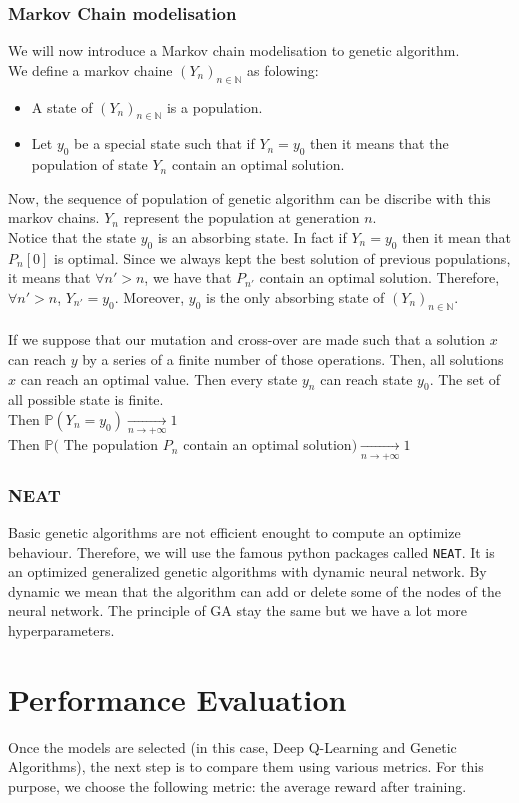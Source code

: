 \documentclass[11pt,a4paper]{article}
\newcommand{\mlist}[1]{\begin{itemize}[noitemsep,topsep=0pt]#1\end{itemize}}
\begin{document}
		\section{Markov Chain modelisation}
We will now introduce a Markov chain modelisation to genetic algorithm.\\
We define a markov chaine $(Y_n)_{n\in\mathbb{N}}$ as folowing:
\mlist{
\item A state of $(Y_n)_{n\in\mathbb{N}}$ is a population.
\item Let $y_0$ be a special state such that if $Y_n = y_0$ then it means that the population of state $Y_n$ contain an optimal solution.
}
Now, the sequence of population of genetic algorithm can be discribe with this markov chains. $Y_n$ represent the population at generation $n$.\\
Notice that the state $y_0$ is an absorbing state. In fact if $Y_n = y_0$ then it mean that $P_n[0]$ is optimal. Since we always kept the best solution of previous populations, it means that $\forall n'>n$, we have that $P_{n'}$ contain an optimal solution. Therefore, $\forall n'>n$, $Y_{n'} = y_0$. Moreover, $y_0$ is the only absorbing state of $(Y_n)_{n\in\mathbb{N}}$.\\
\\
If we suppose that our mutation and cross-over are made such that a solution $x$ can reach $y$ by a series of a finite number of those operations. Then, all solutions $x$ can reach an optimal value. Then every state $y_n$ can reach state $y_0$. The set of all possible state is finite.\\
Then $\mathbb{P}(Y_n = y_0) \underset{n \rightarrow +\infty}{\rightarrow} 1$\\
Then $\mathbb{P}($ The population $P_n$ contain an optimal solution$) \underset{n \rightarrow +\infty}{\rightarrow} 1$
		
		\section{NEAT}
Basic genetic algorithms are not efficient enought to compute an optimize behaviour. Therefore, we will use the famous python packages called \texttt{NEAT}. It is an optimized generalized genetic algorithms with dynamic neural network. By dynamic we mean that the algorithm can add or delete some of the nodes of the neural network. The principle of GA stay the same but we have a lot more hyperparameters.
	
	
	\part{Performance Evaluation}
	Once the models are selected (in this case, Deep Q-Learning and Genetic Algorithms), the next step is to compare them using various metrics. For this purpose, we choose the following metric: the average reward after training.
\end{document}
